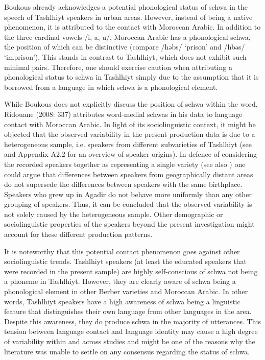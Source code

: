 Boukous already acknowledges a potential phonological status of schwa in the speech of Tashlhiyt speakers in urban areas. However, instead of being a native phenomenon, it is attributed to the contact with Moroccan Arabic. In addition to the three cardinal vowels /i, a, u/, Moroccan Arabic has a phonological schwa, the position of which can be distinctive (compare /həbs/ ‘prison’ and /hbəs/ ‘imprison’). This stands in contrast to Tashlhiyt, which does not exhibit such minimal pairs. Therefore, one should exercise caution when attributing a phonological status to schwa in Tashlhiyt simply due to the assumption that it is borrowed from a language in which schwa is a phonological element.  

While Boukous does not explicitly discuss the position of schwa within the word, Ridouane (2008: 337) attributes word-medial schwas in his data to language contact with Moroccan Arabic. In light of its sociolinguistic context, it might be objected that the observed variability in the present production data is due to a heterogeneous sample, i.e. speakers from different subvarieties of Tashlhiyt (see  and Appendix A2.2 for an overview of speaker origins). In defence of considering the recorded speakers together as representing a single variety (see also \citealt{Bruggeman.etal2017}) one could argue that differences between speakers from geographically distant areas do not supersede the differences between speakers with the same birthplace. Speakers who grew up in Agadir do not behave more uniformly than any other grouping of speakers. Thus, it can be concluded that the observed variability is not solely caused by the heterogeneous sample. Other demographic or sociolinguistic properties of the speakers beyond the present investigation might account for these different production patterns. 

It is noteworthy that this potential contact phenomenon goes against other sociolinguistic trends. Tashlhiyt speakers (at least the educated speakers that were recorded in the present sample) are highly self-conscious of schwa not being a phoneme in Tashlhiyt. However, they are clearly aware of schwa being a phonological element in other Berber varieties and Moroccan Arabic. In other words, Tashlhiyt speakers have a high awareness of schwa being a linguistic feature that distinguishes their own language from other languages in the area. Despite this awareness, they do produce schwa in the majority of utterances. This tension between language contact and language identity may cause a high degree of variability within and across studies and might be one of the reasons why the literature was unable to settle on any consensus regarding the status of schwa.

